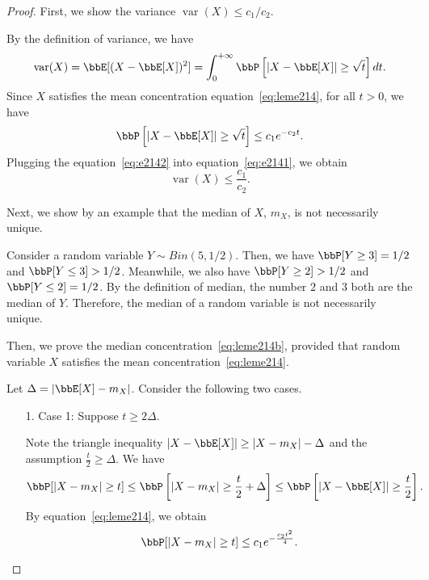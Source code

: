 \documentclass[11pt]{article}
\DeclareMathOperator{\var}{var}
\newcommand{\off}[1]{\left[#1\right]}
\theoremstyle{plain}
\theoremstyle{definition}
\begin{document}
\begin{proof}
	First, we show the variance  $\var(X) \leq {c_1}/{c_2}$.
	
	\vspace{0.2cm}
	
	By the definition of variance, we have
	\begin{equation}\label{eq:e2141}
		\var(X) = \bbE[(X-\bbE[X])^2] = \int_{0}^{+\infty} \bbP \off{|X - \bbE[X]| \geq \sqrt{t} }dt.
	\end{equation}
	Since $X$ satisfies the mean concentration equation~\eqref{eq:leme214}, for all $t > 0$, we have
	\begin{equation}\label{eq:e2142}
		\bbP \off{|X - \bbE[X]| \geq \sqrt{t} } \leq c_1 e^{-c_2 t}.
	\end{equation}
	Plugging the equation~\eqref{eq:e2142} into equation~\eqref{eq:e2141}, we obtain
	\[ \var(X) \leq \frac{c_1}{c_2}. \]
	
	\vspace{0.2cm}
	
	Next, we show by an example that the median of $X$, $m_X$, is not necessarily unique.
	
	\vspace{0.2cm}
	Consider a random variable $Y \sim Bin(5,1/2)$. Then, we have $\bbP[Y \geq 3] = 1/2$ and $\bbP[Y \leq 3] > 1/2$. Meanwhile, we also have $\bbP[Y \geq 2] > 1/2$ and $\bbP[Y \leq 2] = 1/2$. By the definition of median, the number $2$ and $3$ both are the median of $Y$. Therefore, the median of a random variable is not necessarily unique.
	
	\vspace{0.2cm}
	
	Then, we prove the median concentration~\eqref{eq:leme214b}, provided that random variable $X$ satisfies the mean concentration~\eqref{eq:leme214}.
	
	\vspace{0.2cm}
	
	Let $\Delta = |\bbE[X] - m_X|$. Consider the following two cases.
	\begin{enumerate}
		\item[1.] Case 1: Suppose $t \geq 2\Delta$. 
		
		\vspace{0.2cm}
		Note the triangle inequality $|X - \bbE[X]| \geq |X - m_X| - \Delta$ and the assumption $\frac{t}{2} \geq \Delta$. We have
		\begin{equation}
			\bbP[|X - m_X| \geq t] \leq \bbP \off{|X - m_X| \geq \frac{t}{2} + \Delta} \leq   \bbP \off{|X - \bbE[X]|  \geq \frac{t}{2}}.
		\end{equation}
		By equation~\eqref{eq:leme214}, we obtain
		\begin{equation}\label{eq:e214case1}
			\bbP[|X - m_X| \geq t] \leq c_1 e^{-\frac{c_2t^2}{4}}.
		\end{equation}
		

\end{enumerate}
\end{proof}
\end{document}
